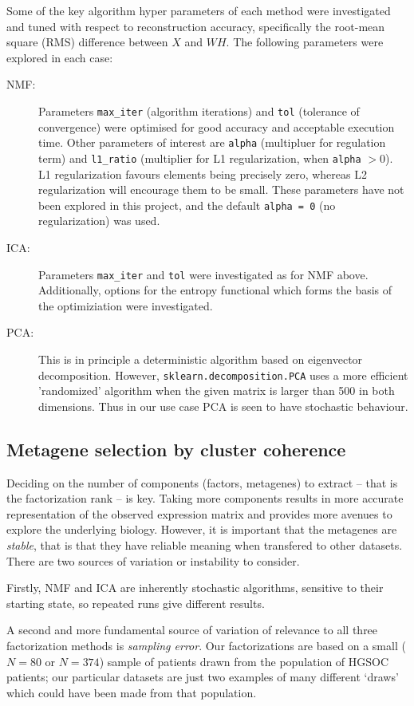 \documentclass[draft, tikz, 12pt,a4paper,oneside,fleqn]{article}
\begin{document}
Some of the key algorithm hyper parameters of each method were investigated and tuned with respect to reconstruction accuracy, specifically the root-mean square (RMS) difference between $X$ and $W H$. The following parameters were explored in each case:
\begin{description}
\item[NMF:] Parameters {\tt max\_iter} (algorithm iterations) and {\tt tol} (tolerance of convergence) were optimised for good accuracy and acceptable execution time.  Other parameters of interest are {\tt alpha} (multipluer for regulation term) and {\tt l1\_ratio} (multiplier for L1 regularization, when {\tt alpha} $> 0$).  L1 regularization  favours elements being precisely zero, whereas L2 regularization will encourage them to be small.  These parameters have not been explored in this project, and the default {\tt alpha = 0} (no regularization) was used.
\item[ICA:]  Parameters {\tt max\_iter} and {\tt tol} were investigated as for NMF above.  Additionally, options for the entropy functional which forms the basis of the optimiziation were investigated.
\item[PCA:] This is in principle a deterministic algorithm based on eigenvector decomposition.  However, {\tt sklearn.decomposition.PCA} uses a more efficient 'randomized' algorithm when the given matrix is larger than 500 in both dimensions.  Thus in our use case PCA is seen to have stochastic behaviour.
\end{description}

\subsection{Metagene selection by cluster coherence}
\label{sec-metagene-selection}
Deciding on the number of components (factors, metagenes) to extract -- that is the factorization rank -- is key.  Taking more components results in more accurate representation of the observed expression matrix and provides more avenues to explore the underlying biology.  However, it is important that the metagenes are \emph{stable}, that is that they have reliable meaning when transfered to other datasets.   There are two sources of variation or instability to consider.

Firstly, NMF and ICA are inherently stochastic algorithms, sensitive to their starting state, so repeated runs give different results.

A second and more fundamental source of variation of relevance to all three factorization methods is \emph{sampling error}.   Our factorizations are based on a small ($N=80$ or $N=374$) sample of patients drawn from the population of HGSOC patients; our particular datasets are just two examples of many different `draws' which could have been made from that population.
\end{document}
